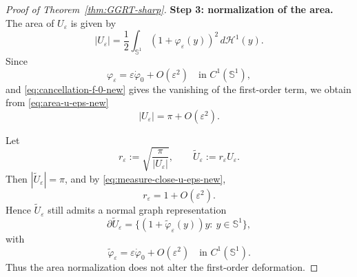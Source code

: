 \documentclass[a4paper,11pt,reqno]{amsart}
\numberwithin{equation}{section}
\theoremstyle{plain} %
\theoremstyle{definition} %
\theoremstyle{remark}
\begin{document}
\begin{proof}[Proof of Theorem~\ref{thm:GGRT-sharp}]
\medskip
\noindent
{\bf Step 3: normalization of the area.} The area of $U_\varepsilon$ is given by
\begin{equation}\label{eq:area-u-eps-new}
|U_\varepsilon|
=
\frac12\int_{\mathbb S^1} (1+\varphi_\varepsilon(y))^2\,d\mathcal H^1(y).
\end{equation}
Since
\[
\varphi_\varepsilon
=
\varepsilon \dot\varphi_0 + O(\varepsilon^2)
\quad \text{in } C^1(\mathbb S^1),
\]
and \eqref{eq:cancellation-f-0-new} gives the vanishing of the first-order
term, we obtain from \eqref{eq:area-u-eps-new}
\begin{equation}\label{eq:measure-close-u-eps-new}
|U_\varepsilon|=\pi+O(\varepsilon^2).
\end{equation}

Let
\[
r_\varepsilon:=\sqrt{\frac{\pi}{|U_\varepsilon|}},
\qquad
\widetilde U_\varepsilon:=r_\varepsilon U_\varepsilon.
\]
Then $|\widetilde U_\varepsilon|=\pi$, and by
\eqref{eq:measure-close-u-eps-new},
\[
r_\varepsilon=1+O(\varepsilon^2).
\]
Hence $\widetilde U_\varepsilon$ still admits a normal graph representation
\[
\partial \widetilde U_\varepsilon
=
\{(1+\widetilde\varphi_\varepsilon(y))y:\ y\in \mathbb S^1\},
\]
with
\[
\widetilde\varphi_\varepsilon
=
\varepsilon \dot\varphi_0 + O(\varepsilon^2)
\quad \text{in } C^1(\mathbb S^1).
\]
Thus the area normalization does not alter the first-order deformation.


\end{proof}
\end{document}
